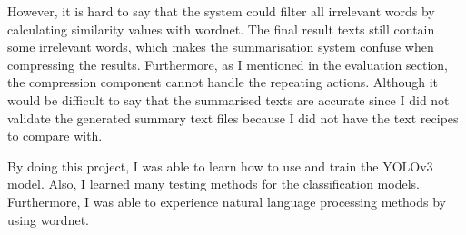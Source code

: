\documentclass{article}
\begin{document}
However, it is hard to say that the system could filter all irrelevant words by calculating similarity values with wordnet. The final result texts still contain some irrelevant words, which makes the summarisation system confuse when compressing the results. Furthermore, as I mentioned in the evaluation section, the compression component cannot handle the repeating actions. Although it would be difficult to say that the summarised texts are accurate since I did not validate the generated summary text files because I did not have the text recipes to compare with.

By doing this project, I was able to learn how to use and train the YOLOv3 model. Also, I learned many testing methods for the classification models. Furthermore, I was able to experience natural language processing methods by using wordnet.


\newpage
\end{document}
